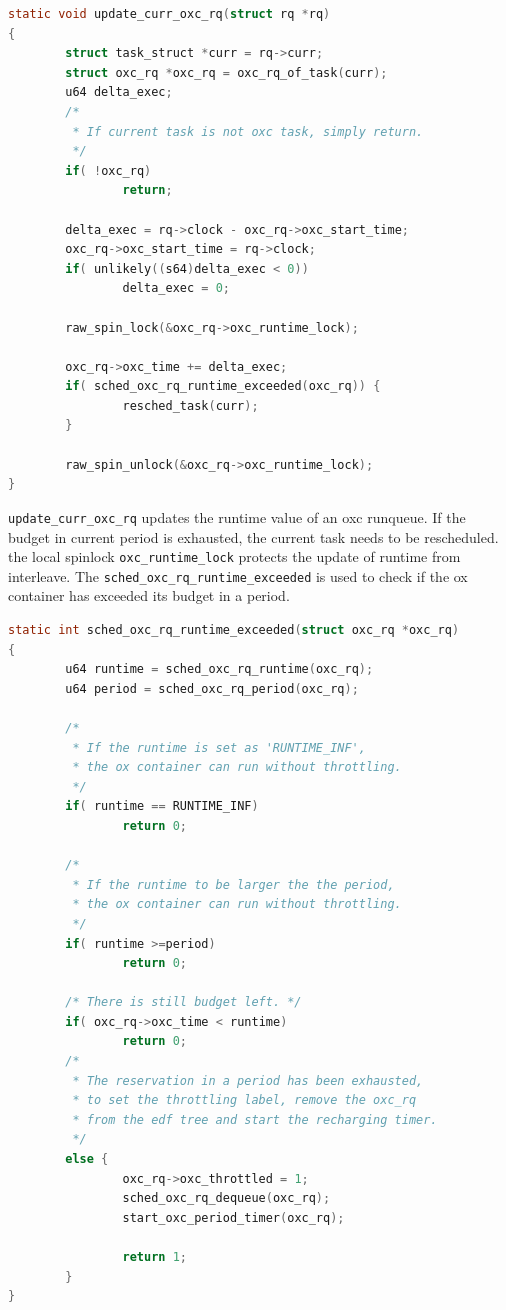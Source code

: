 \begin{lstlisting}[language=C, 
		caption={Update an ox container's runtime information}]
static void update_curr_oxc_rq(struct rq *rq)
{
        struct task_struct *curr = rq->curr;
        struct oxc_rq *oxc_rq = oxc_rq_of_task(curr);
        u64 delta_exec;
        /*
         * If current task is not oxc task, simply return.
         */
        if( !oxc_rq)
                return;

        delta_exec = rq->clock - oxc_rq->oxc_start_time;
        oxc_rq->oxc_start_time = rq->clock;
        if( unlikely((s64)delta_exec < 0))
                delta_exec = 0;

        raw_spin_lock(&oxc_rq->oxc_runtime_lock);

        oxc_rq->oxc_time += delta_exec;
        if( sched_oxc_rq_runtime_exceeded(oxc_rq)) {
                resched_task(curr);
        }

        raw_spin_unlock(&oxc_rq->oxc_runtime_lock);
}
\end{lstlisting}

\texttt{update\_curr\_oxc\_rq} updates the runtime value of 
an oxc runqueue. If the budget in current period is exhausted, the
current task needs to be rescheduled. the local spinlock 
\texttt{oxc\_runtime\_lock} protects the update of runtime from
interleave. The \texttt{sched\_oxc\_rq\_runtime\_exceeded} is
used to check if the ox container has exceeded its budget in a
period.

\begin{lstlisting}[language=C, 
	caption={Check if an ox container should be throttled}]
static int sched_oxc_rq_runtime_exceeded(struct oxc_rq *oxc_rq)
{
        u64 runtime = sched_oxc_rq_runtime(oxc_rq);
        u64 period = sched_oxc_rq_period(oxc_rq);

        /* 
         * If the runtime is set as 'RUNTIME_INF',
         * the ox container can run without throttling.
         */
        if( runtime == RUNTIME_INF)
                return 0;

        /* 
         * If the runtime to be larger the the period,
         * the ox container can run without throttling.
         */
        if( runtime >=period)
                return 0;

        /* There is still budget left. */
        if( oxc_rq->oxc_time < runtime)
                return 0;
        /* 
         * The reservation in a period has been exhausted,
         * to set the throttling label, remove the oxc_rq
         * from the edf tree and start the recharging timer.
         */
        else {
                oxc_rq->oxc_throttled = 1;
                sched_oxc_rq_dequeue(oxc_rq);
                start_oxc_period_timer(oxc_rq);

                return 1;
        }
}
\end{lstlisting}

